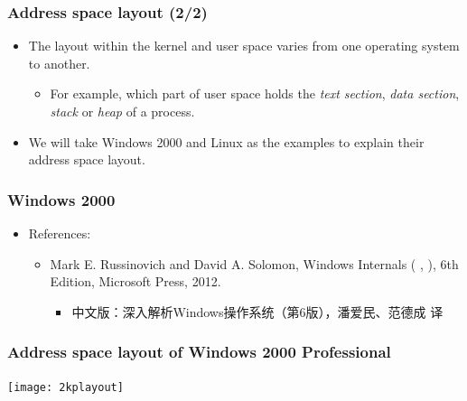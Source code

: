 \documentclass[CJKutf8,xcolor=pdftex,dvipsnames,table]{beamer}
\begin{document}
\begin{CJK*}{UTF8}{song}
  
  \begin{frame}
    \frametitle{Address space layout (2/2)} \pause
    \begin{itemize}
    \item{The layout within the kernel and user space varies from one operating system to another.} \pause
      \begin{itemize}
      \item{For example, which part of user space holds the \emph{text section}, \emph{data section}, \emph{stack} or \emph{heap} of a process.} \pause
      \end{itemize}
    \item{We will take Windows 2000 and Linux as the examples to explain their address space layout.}
    \end{itemize}
  \end{frame}
  
  \begin{frame}
    \frametitle{Windows 2000} \pause
    \begin{itemize}
    \item{References:} \pause
      \begin{itemize}
          \item{Mark E. Russinovich and David A. Solomon, Windows Internals ( 
,
), 6th Edition, Microsoft Press, 2012.} \pause
        \begin{itemize}
        \item{中文版：深入解析Windows操作系统（第6版），潘爱民、范德成 译} \pause
        \end{itemize}
      \end{itemize}
    \end{itemize}
  \end{frame}
  
  \begin{frame}
    \frametitle{Address space layout of Windows 2000 Professional} \pause
    \begin{center}
      \texttt{[image: 2kplayout]}
    \end{center}
  \end{frame}
  

\end{CJK*}
\end{document}

